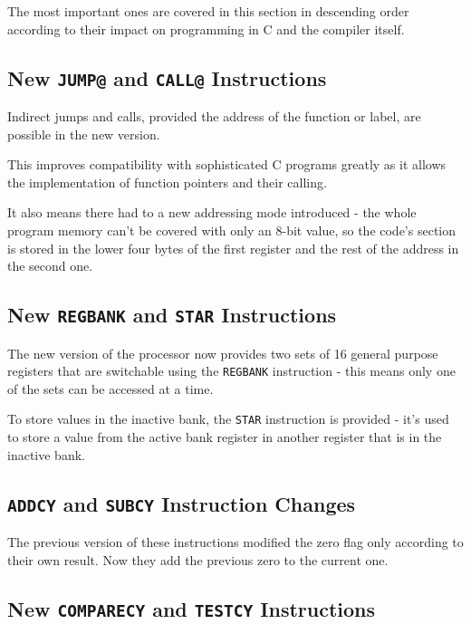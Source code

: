     The most important ones are covered in this section in descending order according to their impact on programming in C and the compiler itself.

        \subsection{New \texttt{JUMP@} and \texttt{CALL@} Instructions}

        Indirect jumps and calls, provided the address of the function or label, are possible in the new version.

        This improves compatibility with sophisticated C programs greatly as it allows the implementation of function pointers and their calling.

        It also means there had to a new addressing mode introduced - the whole program memory can't be covered with only an 8-bit value, so the code's section is stored in the lower four bytes of the first register and the rest of the address in the second one.

        \subsection{New \texttt{REGBANK} and \texttt{STAR} Instructions}

        The new version of the processor now provides two sets of 16 general purpose registers that are switchable using the \texttt{REGBANK} instruction - this means only one of the sets can be accessed at a time.

        To store values in the inactive bank, the \texttt{STAR} instruction is provided - it's used to store a value from the active bank register in another register that is in the inactive bank.

        \subsection{\texttt{ADDCY} and \texttt{SUBCY} Instruction Changes}

        The previous version of these instructions modified the zero flag only according to their own result. Now they add the previous zero to the current one.

        \subsection{New \texttt{COMPARECY} and \texttt{TESTCY} Instructions}

